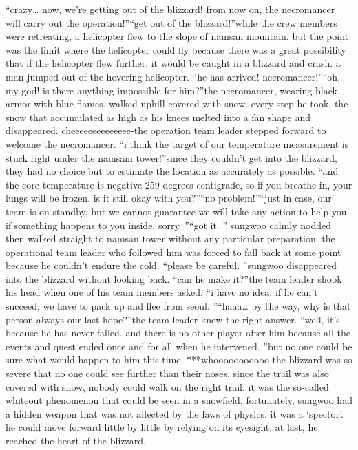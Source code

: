 “crazy… now, we’re getting out of the blizzard! from now on, the necromancer will carry out the operation!”“get out of the blizzard!”while the crew members were retreating, a helicopter flew to the slope of namsan mountain.
 but the point was the limit where the helicopter could fly because there was a great possibility that if the helicopter flew further, it would be caught in a blizzard and crash.
a man jumped out of the hovering helicopter.
“he has arrived! necromancer!”“oh, my god! is there anything impossible for him?”the necromancer, wearing black armor with blue flames, walked uphill covered with snow.
every step he took, the snow that accumulated as high as his knees melted into a fan shape and disappeared.
cheeeeeeeeeeeeee-the operation team leader stepped forward to welcome the necromancer.
“i think the target of our temperature measurement is stuck right under the namsam tower!”since they couldn’t get into the blizzard, they had no choice but to estimate the location as accurately as possible.
“and the core temperature is negative 259 degrees centigrade, so if you breathe in, your lungs will be frozen.
 is it still okay with you?”“no problem!”“just in case, our team is on standby, but we cannot guarantee we will take any action to help you if something happens to you inside.
 sorry.
”“got it.
” sungwoo calmly nodded then walked straight to namsan tower without any particular preparation.
the operational team leader who followed him was forced to fall back at some point because he couldn’t endure the cold.
“please be careful.
”sungwoo disappeared into the blizzard without looking back.
“can he make it?”the team leader shook his head when one of his team members asked.
“i have no idea.
 if he can’t succeed, we have to pack up and flee from seoul.
”“haaa… by the way, why is that person always our last hope?”the team leader knew the right answer.
“well, it’s because he has never failed.
 and there is no other player after him because all the events and quest ended once and for all when he intervened.
”but no one could be sure what would happen to him this time.
***whooooooooooo-the blizzard was so severe that no one could see further than their noses.
 since the trail was also covered with snow, nobody could walk on the right trail.
 it was the so-called whiteout phenomenon that could be seen in a snowfield.
fortunately, sungwoo had a hidden weapon that was not affected by the laws of physics.
 it was a ‘spector’.
 he could move forward little by little by relying on its eyesight.
at last, he reached the heart of the blizzard.


